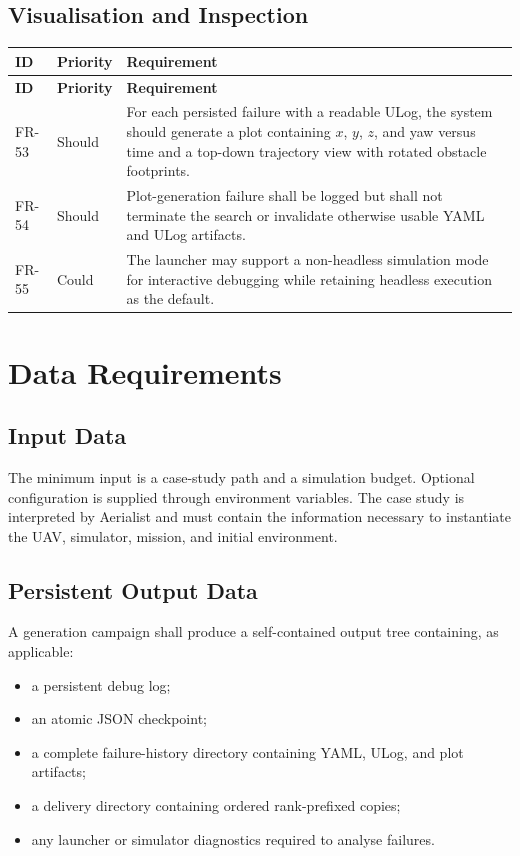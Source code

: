 \documentclass[11pt,a4paper,openany]{report}
\begin{document}
\subsection{Visualisation and Inspection}
\begin{longtable}{L{1.7cm} L{2.1cm} L{10.8cm}}
\toprule
\textbf{ID} & \textbf{Priority} & \textbf{Requirement}\\
\midrule
\endfirsthead
\toprule
\textbf{ID} & \textbf{Priority} & \textbf{Requirement}\\
\midrule
\endhead
FR-53 & Should & For each persisted failure with a readable ULog, the system should generate a plot containing $x$, $y$, $z$, and yaw versus time and a top-down trajectory view with rotated obstacle footprints.\\
FR-54 & Should & Plot-generation failure shall be logged but shall not terminate the search or invalidate otherwise usable YAML and ULog artifacts.\\
FR-55 & Could & The launcher may support a non-headless simulation mode for interactive debugging while retaining headless execution as the default.\\
\bottomrule
\end{longtable}

\section{Data Requirements}
\subsection{Input Data}
The minimum input is a case-study path and a simulation budget. Optional configuration is supplied through environment variables. The case study is interpreted by Aerialist and must contain the information necessary to instantiate the UAV, simulator, mission, and initial environment.

\subsection{Persistent Output Data}
A generation campaign shall produce a self-contained output tree containing, as applicable:
\begin{itemize}
  \item a persistent debug log;
  \item an atomic JSON checkpoint;
  \item a complete failure-history directory containing YAML, ULog, and plot artifacts;
  \item a delivery directory containing ordered rank-prefixed copies;
  \item any launcher or simulator diagnostics required to analyse failures.
\end{itemize}
\end{document}
